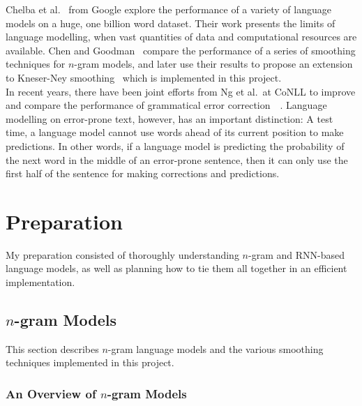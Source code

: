 \documentclass[a4paper, 12pt]{report}
\begin{document}
Chelba et al.~\cite{1bw:chelba2013} from Google explore the performance of a variety of language models on a huge, one billion word dataset. Their work presents the limits of language modelling, when vast quantities of data and computational resources are available. Chen and Goodman~\cite{smoothing:chen1996} compare the performance of a series of smoothing techniques for $n$-gram models, and later use their results to propose an extension to Kneser-Ney smoothing~\cite{modified_kneser_ney:chen1999} which is implemented in this project. \\

In recent years, there have been joint efforts from Ng et al.\ at CoNLL to improve and compare the performance of grammatical error correction~\cite{error_correction2013:ng2013}~\cite{error_correction2014:ng2014}. Language modelling on error-prone text, however, has an important distinction: A test time, a language model cannot use words ahead of its current position to make predictions. In other words, if a language model is predicting the probability of the next word in the middle of an error-prone sentence, then it can only use the first half of the sentence for making corrections and predictions.


\chapter{Preparation}

My preparation consisted of thoroughly understanding $n$-gram and RNN-based language models, as well as planning how to tie them all together in an efficient implementation.

\section{$n$-gram Models}

This section describes $n$-gram language models and the various smoothing techniques implemented in this project.

\subsection{An Overview of $n$-gram Models}
\end{document}
